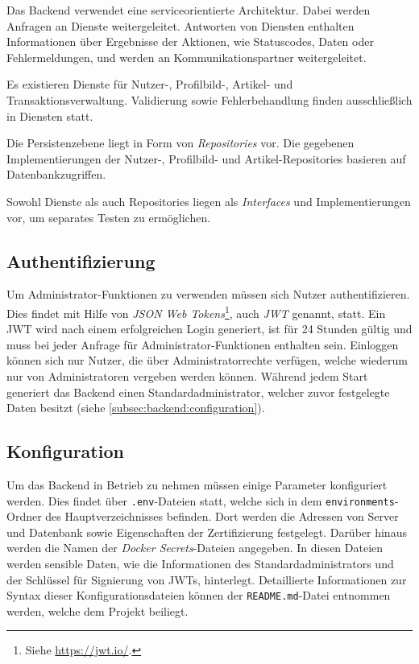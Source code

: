\documentclass[a4paper, 11pt]{article}
\begin{document}
Das Backend verwendet eine serviceorientierte Architektur.
Dabei werden Anfragen an Dienste weitergeleitet.
Antworten von Diensten enthalten Informationen über Ergebnisse der Aktionen, wie Statuscodes, Daten oder Fehlermeldungen, und werden an Kommunikationspartner weitergeleitet.

Es existieren Dienste für Nutzer-, Profilbild-, Artikel- und Transaktionsverwaltung.
Validierung sowie Fehlerbehandlung finden ausschließlich in Diensten statt.

Die Persistenzebene liegt in Form von \textit{Repositories} vor.
Die gegebenen Implementierungen der Nutzer-, Profilbild- und Artikel-Repositories basieren auf Datenbankzugriffen.

Sowohl Dienste als auch Repositories liegen als \textit{Interfaces} und Implementierungen vor, um separates Testen zu ermöglichen.

\subsection{Authentifizierung}
\label{subsec:backend:authentication}

Um Administrator-Funktionen zu verwenden müssen sich Nutzer authentifizieren.
Dies findet mit Hilfe von \textit{JSON Web Tokens}\footnote{Siehe \url{https://jwt.io/}.}, auch \textit{JWT} genannt, statt.
Ein JWT wird nach einem erfolgreichen Login generiert, ist für 24 Stunden gültig und muss bei jeder Anfrage für Administrator-Funktionen enthalten sein.
Einloggen können sich nur Nutzer, die über Administratorrechte verfügen, welche wiederum nur von Administratoren vergeben werden können.
Während jedem Start generiert das Backend einen Standard\-administrator, welcher zuvor festgelegte Daten besitzt (siehe \autoref{subsec:backend:configuration}).

\subsection{Konfiguration}
\label{subsec:backend:configuration}

Um das Backend in Betrieb zu nehmen müssen einige Parameter konfiguriert werden.
Dies findet über \verb|.env|-Dateien statt, welche sich in dem \verb|environments|-Ordner des Hauptverzeichnisses befinden.
Dort werden die Adressen von Server und Datenbank sowie Eigenschaften der Zertifizierung festgelegt.
Darüber hinaus werden die Namen der \textit{Docker Secrets}-Dateien angegeben.
In diesen Dateien werden sensible Daten, wie die Informationen des Standardadministrators und der Schlüssel für Signierung von JWTs, hinterlegt.
Detaillierte Informationen zur Syntax dieser Konfigurationsdateien können der \verb|README.md|-Datei entnommen werden, welche dem Projekt beiliegt.
\end{document}
